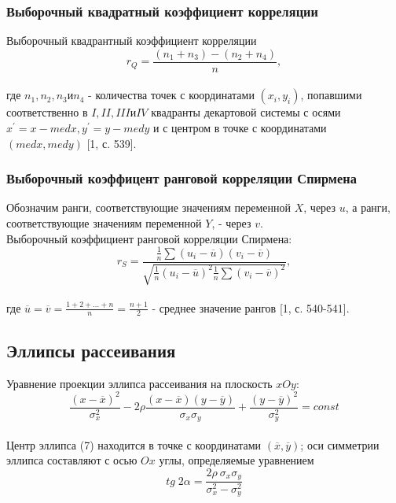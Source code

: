 	\subsubsection {Выборочный квадратный коэффициент корреляции}
		Выборочный квадрантный коэффициент корреляции\\
		\begin{equation}r_Q = \frac{(n_1 + n_3) - (n_2 + n_4)}{n},\end{equation}\\
		где $n_1, n_2, n_3 и n_4$ - количества точек с координатами $(x_i, y_i)$, попавшими соответственно в $I, II, III и IV$ квадранты декартовой системы с осями $x^{'} = x - med x, y^{'} = y - med y$ и с центром в точке с координатами $(med x, med y)$ [1, с. 539].

	\subsubsection {Выборочный коэффицент  ранговой корреляции Спирмена}
		Обозначим ранги, соответствующие значениям переменной $X$, через $u$, а ранги, соответствующие значениям переменной $Y$, - через $v$.\\
		Выборочный коэффициент ранговой корреляции Спирмена:\\
		\begin{equation}r_S = \frac{\frac{1}{n}\sum(u_i - \overline u)(v_i - \overline v)}{\sqrt{\frac{1}{n}(u_i - \overline u)^2\frac{1}{n}\sum(v_i - \overline v)^2}},\end{equation}\\
		где $\overline u = \overline v = \frac{1 + 2 + ... + n}{n} = \frac{n + 1}{2}$ - среднее значение рангов [1, с. 540-541].

\subsection {Эллипсы рассеивания}
	Уравнение проекции эллипса рассеивания на плоскость $xOy$:\\
	\begin{equation}\frac{(x - \overline x)^2}{\sigma_x^2} - 2\rho\frac{(x - \overline x)(y - \overline y)}{\sigma_x\sigma_y} + \frac{(y - \overline y)^2}{\sigma_y^2} = const\end{equation}\\
	Центр эллипса (7) находится в точке с координатами $(\overline x, \overline y)$; оси симметрии эллипса составляют с осью $Ox$ углы, определяемые уравнением\\
	\begin{equation}
		tg \; 2\alpha = \frac{2\rho \ \sigma_x \sigma_y}{\sigma_x^2 - \sigma_y^2}
	\end{equation}

